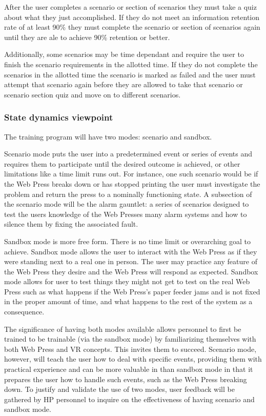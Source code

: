 \documentclass[onecolumn, draftclsnofoot,10pt, compsoc]{IEEEtran}
\begin{document}
After the user completes a scenario or section of scenarios they must take a quiz about what they just accomplished. If they do not meet an information retention rate of at least 90\% they must complete the scenario or section of scenarios again until they are ale to achieve 90\% retention or better.

Additionally, some scenarios may be time dependant and require the user to finish the scenario requirements in the allotted time. If they do not complete the scenarios in the allotted time the scenario is marked as failed and the user must attempt that scenario again before they are allowed to take that scenario or scenario section quiz and move on to different scenarios.
\subsubsection{State dynamics viewpoint}
The training program will have two modes: scenario and sandbox.

Scenario mode puts the user into a predetermined event or series of events and requires them to participate until the desired outcome is achieved, or other limitations like a time limit runs out. For instance, one such scenario would be if the Web Press breaks down or has stopped printing the user must investigate the problem and return the press to a nominally functioning state. A subsection of the scenario mode will be the alarm gauntlet: a series of scenarios designed to test the users knowledge of the Web Presses many alarm systems and how to silence them by fixing the associated fault.

Sandbox mode is more free form. There is no time limit or overarching goal to achieve. Sandbox mode allows the user to interact with the Web Press as if they were standing next to a real one in person. The user may practice any feature of the Web Press they desire and the Web Press will respond as expected. Sandbox mode allows for user to test things they might not get to test on the real Web Press such as what happens if the Web Press's paper feeder jams and is not fixed in the proper amount of time, and what happens to the rest of the system as a consequence.

The significance of having both modes available allows personnel to first be trained to be trainable (via the sandbox mode) by familiarizing themselves with both Web Press and VR concepts. This invites them to succeed. Scenario mode, however, will teach the user how to deal with specific events, providing them with practical experience and can be more valuable in than sandbox mode in that it prepares the user how to handle such events, such as the Web Press breaking down. To justify and validate the use of two modes, user feedback will be gathered by HP personnel to inquire on the effectiveness of having scenario and sandbox mode.
\end{document}
